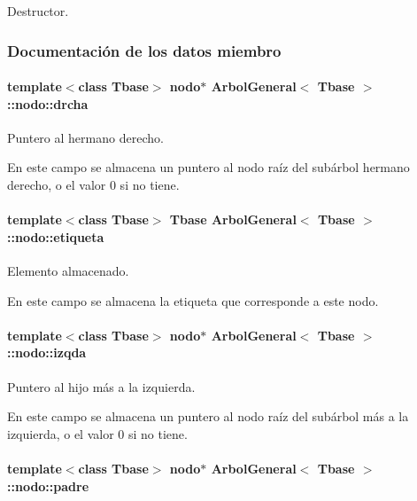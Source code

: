 Destructor. 



\subsubsection{Documentación de los datos miembro}
\hypertarget{structArbolGeneral_1_1nodo_a8d0a58447171461212942f9308ef4f36}{
\paragraph[{drcha}]{\setlength{\rightskip}{0pt plus 5cm}template$<$class Tbase$>$ {\bf nodo}$\ast$ {\bf Arbol\-General}$<$ Tbase $>$\-::nodo\-::drcha}}\label{structArbolGeneral_1_1nodo_a8d0a58447171461212942f9308ef4f36}


Puntero al hermano derecho. 

En este campo se almacena un puntero al nodo raíz del subárbol hermano derecho, o el valor 0 si no tiene. \hypertarget{structArbolGeneral_1_1nodo_ab7223965c5a62aa93895f3decd7a109a}{
\paragraph[{etiqueta}]{\setlength{\rightskip}{0pt plus 5cm}template$<$class Tbase$>$ Tbase {\bf Arbol\-General}$<$ Tbase $>$\-::nodo\-::etiqueta}}\label{structArbolGeneral_1_1nodo_ab7223965c5a62aa93895f3decd7a109a}


Elemento almacenado. 

En este campo se almacena la etiqueta que corresponde a este nodo. \hypertarget{structArbolGeneral_1_1nodo_a3b8075b9fd0dc27c2272ba48bd9a9221}{
\paragraph[{izqda}]{\setlength{\rightskip}{0pt plus 5cm}template$<$class Tbase$>$ {\bf nodo}$\ast$ {\bf Arbol\-General}$<$ Tbase $>$\-::nodo\-::izqda}}\label{structArbolGeneral_1_1nodo_a3b8075b9fd0dc27c2272ba48bd9a9221}


Puntero al hijo más a la izquierda. 

En este campo se almacena un puntero al nodo raíz del subárbol más a la izquierda, o el valor 0 si no tiene. \hypertarget{structArbolGeneral_1_1nodo_ab4d70a0179e8450b2842bbf1a6481402}{
\paragraph[{padre}]{\setlength{\rightskip}{0pt plus 5cm}template$<$class Tbase$>$ {\bf nodo}$\ast$ {\bf Arbol\-General}$<$ Tbase $>$\-::nodo\-::padre}}\label{structArbolGeneral_1_1nodo_ab4d70a0179e8450b2842bbf1a6481402}


